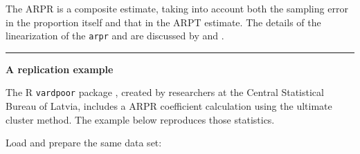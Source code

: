 \documentclass[]{book}
\begin{document}
The ARPR is a composite estimate, taking into account both the sampling
error in the proportion itself and that in the ARPT estimate. The
details of the linearization of the \texttt{arpr} and are discussed by
\citet{deville1999} and \citet{osier2009}.

\begin{center}\rule{0.5\linewidth}{\linethickness}\end{center}

\textbf{A replication example}

The R \texttt{vardpoor} package \citep{vardpoor}, created by researchers
at the Central Statistical Bureau of Latvia, includes a ARPR coefficient
calculation using the ultimate cluster method. The example below
reproduces those statistics.

Load and prepare the same data set:
\end{document}
